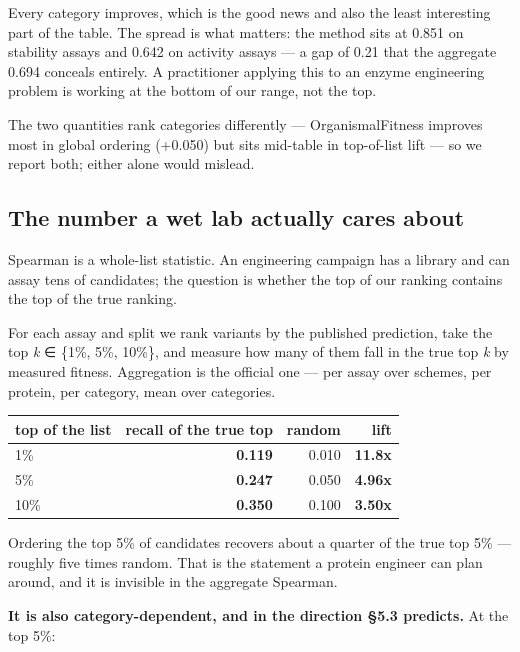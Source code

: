 \documentclass[sigconf,review,nonacm]{acmart}
\begin{document}
Every category improves, which is the good news and also the least interesting part of the table. The
spread is what matters: the method sits at 0.851 on stability assays and 0.642 on activity assays --- a
gap of 0.21 that the aggregate 0.694 conceals entirely. A practitioner applying this to an enzyme
engineering problem is working at the bottom of our range, not the top.

The two quantities rank categories differently --- OrganismalFitness improves most in global ordering
(+0.050) but sits mid-table in top-of-list lift --- so we report both; either alone would mislead.

\subsection{The number a wet lab actually cares about}\label{the-number-a-wet-lab-actually-cares-about}

Spearman is a whole-list statistic. An engineering campaign has a library and can assay tens of
candidates; the question is whether the top of our ranking contains the top of the true ranking.

For each assay and split we rank variants by the published prediction, take the top \emph{k} ∈ \{1\%, 5\%, 10\%\},
and measure how many of them fall in the true top \emph{k} by measured fitness. Aggregation is the official
one --- per assay over schemes, per protein, per category, mean over categories.

\begin{table}[t]
\centering
\small
\begin{tabular}{lrrr}
\hline
top of the list & recall of the true top & random & lift \\
\hline
1\% & \textbf{0.119} & 0.010 & \textbf{11.8x} \\
5\% & \textbf{0.247} & 0.050 & \textbf{4.96x} \\
10\% & \textbf{0.350} & 0.100 & \textbf{3.50x} \\
\hline
\end{tabular}
\end{table}

Ordering the top 5\% of candidates recovers about a quarter of the true top 5\% --- roughly five times
random. That is the statement a protein engineer can plan around, and it is invisible in the aggregate
Spearman.

\textbf{It is also category-dependent, and in the direction §5.3 predicts.} At the top 5\%:
\end{document}
